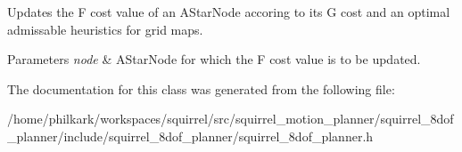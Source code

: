 Updates the F cost value of an A\-Star\-Node accoring to its G cost and an optimal admissable heuristics for grid maps. 


\begin{DoxyParams}{Parameters}
{\em node} & A\-Star\-Node for which the F cost value is to be updated. \\
\hline
\end{DoxyParams}


The documentation for this class was generated from the following file\-:\begin{DoxyCompactItemize}
\item 
/home/philkark/workspaces/squirrel/src/squirrel\-\_\-motion\-\_\-planner/squirrel\-\_\-8dof\-\_\-planner/include/squirrel\-\_\-8dof\-\_\-planner/squirrel\-\_\-8dof\-\_\-planner.\-h\end{DoxyCompactItemize}
